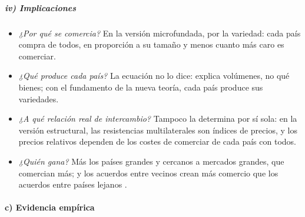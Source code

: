 \documentclass[11pt]{article}
\begin{document}
\subparagraph{iv) Implicaciones}

\begin{itemize}
\item \emph{¿Por qué se comercia?} En la versión microfundada, por la variedad: cada país compra de todos, en proporción a su tamaño y menos cuanto más caro es comerciar.
\item \emph{¿Qué produce cada país?} La ecuación no lo dice: explica volúmenes, no qué bienes; con el fundamento de la nueva teoría, cada país produce sus variedades.
\item \emph{¿A qué relación real de intercambio?} Tampoco la determina por sí sola: en la versión estructural, las resistencias multilaterales son índices de precios, y los precios relativos dependen de los costes de comerciar de cada país con todos.
\item \emph{¿Quién gana?} Más los países grandes y cercanos a mercados grandes, que comercian más; y los acuerdos entre vecinos crean más comercio que los acuerdos entre países lejanos .
\end{itemize}

\paragraph{c) Evidencia empírica}
\end{document}
